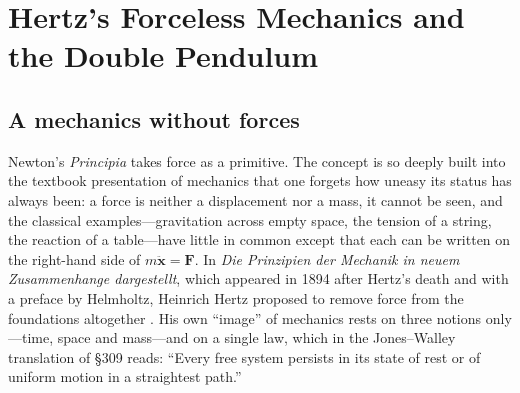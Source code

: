 
\makeatletter
{}
\makeatother

\providecommand{\Rb}{\mathbb{R}}
\providecommand{\Tor}{\mathbb{T}}
\providecommand{\Sph}{\mathbb{S}}
\providecommand{\ud}{\mathrm{d}}
\providecommand{\Lap}{\Delta}
\setlength{\emergencystretch}{2.5em}

\chapter{Hertz's Forceless Mechanics and the Double Pendulum}
\label{ch:hertz-double-pendulum}

\section{A mechanics without forces}
\label{sec:hz-intro}

Newton's \emph{Principia} takes force as a primitive. The concept is so
deeply built into the textbook presentation of mechanics that one forgets
how uneasy its status has always been: a force is neither a displacement
nor a mass, it cannot be seen, and the classical examples---gravitation
across empty space, the tension of a string, the reaction of a table---have
little in common except that each can be written on the right-hand side of
$m\ddot{\mathbf x}=\mathbf F$. In \emph{Die Prinzipien der Mechanik in neuem
Zusammenhange dargestellt}, which appeared in 1894 after Hertz's death
and with a preface by Helmholtz, Heinrich Hertz proposed to remove force
from the foundations altogether \cite{hdp:hertz1894}. His own ``image''
of mechanics rests on three notions only---time, space and mass---and on
a single law, which in the Jones--Walley translation of \S309 reads:
``Every free system persists in its state of rest or of uniform motion in
a straightest path.''

